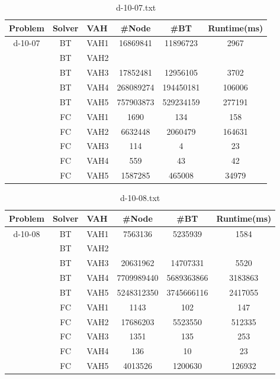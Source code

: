 \documentclass{article}
\begin{document}
\begin{table}[]
\caption{d-10-07.txt}
\label{tab:my-table}
\begin{tabular}{|c|c|c|c|c|c|}
\hline
Problem & Solver & \multicolumn{1}{l|}{VAH} & \#Node & \#BT & \multicolumn{1}{l|}{Runtime(ms)} \\ \hline
\multirow{10}{*}{d-10-07} & BT & VAH1 & 16869841 & 11896723 & 2967 \\ \cline{2-6} 
 & BT & VAH2 &  &  &  \\ \cline{2-6} 
 & BT & VAH3 & 17852481 & 12956105 & 3702 \\ \cline{2-6} 
 & BT & VAH4 & 268089274 & 194450181 & 106006 \\ \cline{2-6} 
 & BT & VAH5 & 757903873 & 529234159 & 277191 \\ \cline{2-6} 
 & FC & VAH1 & 1690 & 134 & 158 \\ \cline{2-6} 
 & FC & VAH2 & 6632448 & 2060479 & 164631 \\ \cline{2-6} 
 & FC & VAH3 & 114 & 4 & 23 \\ \cline{2-6} 
 & FC & VAH4 & 559 & 43 & 42 \\ \cline{2-6} 
 & FC & VAH5 & 1587285 & 465008 & 34979 \\ \hline
\end{tabular}
\end{table}

\begin{table}[]
\caption{d-10-08.txt}
\label{tab:my-table}
\begin{tabular}{|c|c|c|c|c|c|}
\hline
Problem & Solver & \multicolumn{1}{l|}{VAH} & \#Node & \#BT & \multicolumn{1}{l|}{Runtime(ms)} \\ \hline
\multirow{10}{*}{d-10-08} & BT & VAH1 & 7563136 & 5235939 & 1584 \\ \cline{2-6} 
 & BT & VAH2 &  &  &  \\ \cline{2-6} 
 & BT & VAH3 & 20631962 & 14707331 & 5520 \\ \cline{2-6} 
 & BT & VAH4 & 7709989440 & 5689363866 & 3183863 \\ \cline{2-6} 
 & BT & VAH5 & 5248312350 & 3745666116 & 2417055 \\ \cline{2-6} 
 & FC & VAH1 & 1143 & 102 & 147 \\ \cline{2-6} 
 & FC & VAH2 & 17686203 & 5523550 & 512335 \\ \cline{2-6} 
 & FC & VAH3 & 1351 & 135 & 253 \\ \cline{2-6} 
 & FC & VAH4 & 136 & 10 & 23 \\ \cline{2-6} 
 & FC & VAH5 & 4013526 & 1200630 & 126932 \\ \hline
\end{tabular}
\end{table}
\end{document}

